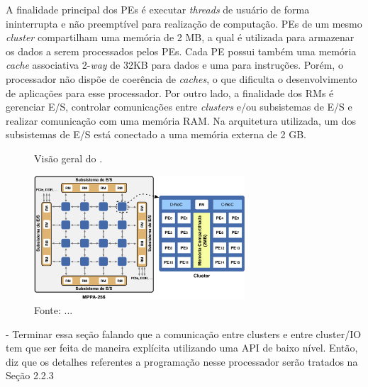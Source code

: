 A finalidade principal dos PEs é executar \textit{threads} de usuário de forma
ininterrupta e não preemptível para realização de computação. PEs de um mesmo
\textit{cluster} compartilham uma memória de 2 MB, a qual é utilizada para
armazenar os dados a serem processados pelos PEs. Cada PE possui também uma
memória \textit{cache} associativa 2-\textit{way} de 32KB para dados e uma para
instruções. Porém, o processador não dispõe de coerência de \textit{caches}, o
que dificulta o desenvolvimento de aplicações para esse processador. Por outro
lado, a finalidade dos RMs é gerenciar E/S, controlar comunicações entre
\textit{clusters} e/ou subsistemas de E/S e realizar comunicação com uma memória
RAM. Na arquitetura utilizada, um dos subsistemas de E/S está conectado a uma
memória externa \lpddr de 2 GB.

\begin{figure}[t]
	\centering
	\caption{Visão geral do \mppa.}
	\includegraphics[width=0.7\textwidth]{figs/mppa-overall.pdf}
    \caption*{Fonte: ...}
	\label{fig:mppa}
\end{figure}

- Terminar essa seção falando que a comunicação entre clusters e entre cluster/IO tem
que ser feita de maneira explícita utilizando uma API de baixo nível. Então, diz que os detalhes
referentes a programação nesse processador serão tratados na Seção 2.2.3


